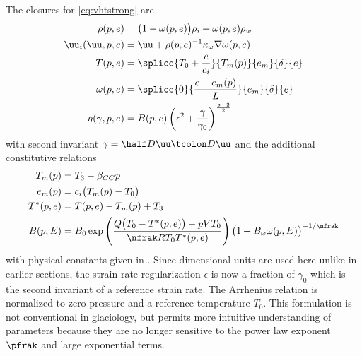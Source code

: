 The closures for \eqref{eq:vhtstrong} are
\begin{subequations}\label{eq:vhtclosure}
  \begin{align}
    \rho(p,e)        & = \big(1-\omega(p,e) \big) \rho_i + \omega(p,e) \rho_w                            \\
    \uu_i(\uu,p,e)   & = \uu + \rho(p,e)^{-1} \kappa_\omega \nabla\omega(p,e) \label{eq:vhtclosure:uice} \\
    T(p,e)           & = \splice{T_0 + \frac{e}{c_i}}{T_m(p)}{e_m}{\delta}{e}                            \\
    \omega(p,e)      & = \splice{0}{\frac{e-e_m(p)}{L}}{e_m}{\delta}{e}                                  \\
    \eta(\gamma,p,e) & = B(p,e)\left(\epsilon^2 + \frac{\gamma}{\gamma_0} \right)^{\frac{\mathfrak{p}-2}{2}}
  \end{align}
\end{subequations}
with second invariant $\gamma = \half D\uu\tcolon D\uu$ and the additional constitutive relations
\begin{align*}
  T_m(p)   & = T_3 - \beta_{CC} p          \\
  e_m(p)   & = c_i \big(T_m(p) - T_0 \big) \\
  T^*(p,e) & = T(p,e) - T_m(p) + T_3       \\
  B(p,E)   & = B_0 \exp \left( \frac{Q\big(T_0-T^*(p,e)\big) - pVT_0}{\nfrak R T_0 T^*(p,e)} \right) \big(1 + B_\omega \omega(p,E) \big)^{-1/\nfrak}
\end{align*}
with physical constants given in .
Since dimensional units are used here unlike in earlier sections, the strain rate regularization $\epsilon$ is now a fraction of $\gamma_0$ which is the second invariant of a reference strain rate.
The Arrhenius relation is normalized to zero pressure and a reference temperature $T_0$.
This formulation is not conventional in glaciology, but permits more intuitive understanding of parameters because they are no longer sensitive to the power law exponent $\pfrak$ and large exponential terms.

